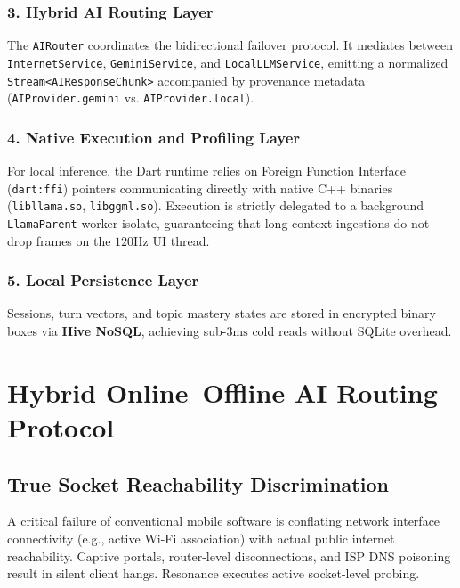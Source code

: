 \documentclass[10.5pt,a4paper]{article}
\begin{document}
\subsubsection{3. Hybrid AI Routing Layer}
The \texttt{AIRouter} coordinates the bidirectional failover protocol. It mediates between \texttt{InternetService}, \texttt{GeminiService}, and \texttt{LocalLLMService}, emitting a normalized \texttt{Stream<AIResponseChunk>} accompanied by provenance metadata (\texttt{AIProvider.gemini} vs. \texttt{AIProvider.local}).

\subsubsection{4. Native Execution and Profiling Layer}
For local inference, the Dart runtime relies on Foreign Function Interface (\texttt{dart:ffi}) pointers communicating directly with native C++ binaries (\texttt{libllama.so}, \texttt{libggml.so}). Execution is strictly delegated to a background \texttt{LlamaParent} worker isolate, guaranteeing that long context ingestions do not drop frames on the $120\text{Hz}$ UI thread.

\subsubsection{5. Local Persistence Layer}
Sessions, turn vectors, and topic mastery states are stored in encrypted binary boxes via \textbf{Hive NoSQL}, achieving sub-$3\text{ms}$ cold reads without SQLite overhead.

\clearpage

\section{Hybrid Online--Offline AI Routing Protocol}

\subsection{True Socket Reachability Discrimination}
A critical failure of conventional mobile software is conflating network interface connectivity (e.g., active Wi-Fi association) with actual public internet reachability. Captive portals, router-level disconnections, and ISP DNS poisoning result in silent client hangs. Resonance executes active socket-level probing.
\end{document}
